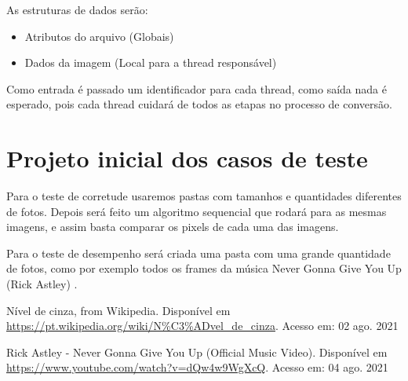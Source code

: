 \documentclass{article}
\begin{document}
    As estruturas de dados serão:
    \begin{itemize}
        \item Atributos do arquivo (Globais)
        \item Dados da imagem (Local para a thread responsável)
    \end{itemize}
    
    
    Como entrada é passado um identificador para cada thread, como saída nada é esperado, pois cada thread cuidará de todos as etapas no processo de conversão. 
     
\section{Projeto inicial dos casos de teste}
    Para o teste de corretude usaremos pastas com tamanhos e quantidades diferentes de fotos. Depois será feito um algoritmo sequencial que rodará para as mesmas imagens, e assim basta comparar os pixels de cada uma das imagens.
    
    Para o teste de desempenho será criada uma pasta com uma grande quantidade de fotos, como por exemplo todos os frames da música Never Gonna Give You Up (Rick Astley) \cite{rickrolled}.
    
\begin{thebibliography}{2}

Nível de cinza, from Wikipedia. Disponível em \url{https://pt.wikipedia.org/wiki/N\%C3\%ADvel_de_cinza}. Acesso em: 02 ago. 2021

Rick Astley - Never Gonna Give You Up (Official Music Video). Disponível em \url{https://www.youtube.com/watch?v=dQw4w9WgXcQ}. Acesso em: 04 ago. 2021

\end{thebibliography}
\end{document}
